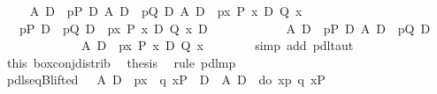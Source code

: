 \begin{isabellebody}
\isanewline
\ \ \isamarkupfalse%
\ {\isachardoublequote}{\isasymturnstile}\ {\isacharparenleft}{\isacharparenleft}A\ {\isasymlongrightarrow}\isactrlsub D\ {\isacharbrackleft}{\isacharhash}\ p{\isacharbrackright}P{\isacharparenright}\ {\isasymand}\isactrlsub D\ {\isacharparenleft}A\ {\isasymlongrightarrow}\isactrlsub D\ {\isacharbrackleft}{\isacharhash}\ p{\isacharbrackright}Q{\isacharparenright}{\isacharparenright}\ {\isasymlongrightarrow}\isactrlsub D\ A\ {\isasymlongrightarrow}\isactrlsub D\ {\isacharbrackleft}{\isacharhash}\ p{\isacharbrackright}{\isacharparenleft}{\isasymlambda}x{\isachardot}\ P\ x\ {\isasymand}\isactrlsub D\ Q\ x{\isacharparenright}{\isachardoublequote}\isanewline
\ \ \isamarkupfalse%
\ {\isacharminus}\isanewline
\ \ \ \ \isamarkupfalse%
\ {\isachardoublequote}{\isasymturnstile}\ {\isacharparenleft}{\isacharbrackleft}{\isacharhash}\ p{\isacharbrackright}P\ {\isasymand}\isactrlsub D\ {\isacharbrackleft}{\isacharhash}\ p{\isacharbrackright}Q\ {\isasymlongrightarrow}\isactrlsub D\ {\isacharbrackleft}{\isacharhash}\ p{\isacharbrackright}{\isacharparenleft}{\isasymlambda}x{\isachardot}\ P\ x\ {\isasymand}\isactrlsub D\ Q\ x{\isacharparenright}{\isacharparenright}\ {\isasymlongrightarrow}\isactrlsub D\isanewline
\ \ \ \ \ \ \ \ \ \ \ \ {\isacharparenleft}{\isacharparenleft}A\ {\isasymlongrightarrow}\isactrlsub D\ {\isacharbrackleft}{\isacharhash}\ p{\isacharbrackright}P{\isacharparenright}\ {\isasymand}\isactrlsub D\ {\isacharparenleft}A\ {\isasymlongrightarrow}\isactrlsub D\ {\isacharbrackleft}{\isacharhash}\ p{\isacharbrackright}Q{\isacharparenright}{\isacharparenright}\ {\isasymlongrightarrow}\isactrlsub D\ \isanewline
\ \ \ \ \ \ \ \ \ \ \ \ \ A\ {\isasymlongrightarrow}\isactrlsub D\ {\isacharbrackleft}{\isacharhash}\ p{\isacharbrackright}{\isacharparenleft}{\isasymlambda}x{\isachardot}\ P\ x\ {\isasymand}\isactrlsub D\ Q\ x{\isacharparenright}{\isachardoublequote}\isanewline
\ \ \ \ \ \ \isamarkupfalse%
\ {\isacharparenleft}simp\ add{\isacharcolon}\ pdl{\isacharunderscore}taut{\isacharparenright}\isanewline
\ \ \ \ \isamarkupfalse%
\ this\ box{\isacharunderscore}conj{\isacharunderscore}distrib{}\ \isamarkupfalse%
\ {\isacharquery}thesis\ \isamarkupfalse%
\ {\isacharparenleft}rule\ pdl{\isacharunderscore}mp{\isacharparenright}\isanewline
\ \ \isamarkupfalse%
\isanewline
\isamarkupfalse%
\isanewline
\isanewline
\isamarkupfalse%
\ pdl{\isacharunderscore}seqB{\isacharunderscore}lifted{}{\isacharcolon}\ {\isachardoublequote}{\isasymturnstile}\ {\isacharparenleft}\ A\ {\isasymlongrightarrow}\isactrlsub D\ {\isacharbrackleft}{\isacharhash}\ p{\isacharbrackright}{\isacharparenleft}{\isasymlambda}x{\isachardot}\ {\isacharbrackleft}{\isacharhash}\ q\ x{\isacharbrackright}P{\isacharparenright}\ {\isacharparenright}\ {\isasymlongleftrightarrow}\isactrlsub D\ {\isacharparenleft}\ A\ {\isasymlongrightarrow}\isactrlsub D\ {\isacharbrackleft}{\isacharhash}\ do\ {\isacharbraceleft}x{\isasymleftarrow}p{\isacharsemicolon}\ q\ x{\isacharbraceright}{\isacharbrackright}P\ {\isacharparenright}{\isachardoublequote}\isanewline

\end{isabellebody}
